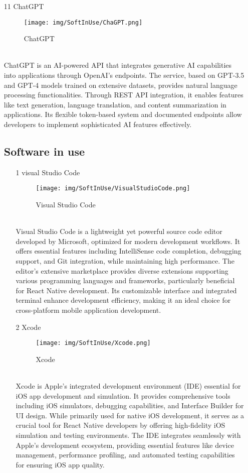 \documentclass[conference]{IEEEtran}
\begin{document}
\begin{enumerate}
\begin{itemize}
\begin{itemize}
\begin{enumerate}
\item[11] ChatGPT
\begin{figure}[h]
\centering
\texttt{[image: img/SoftInUse/ChaGPT.png]}
\caption{ChatGPT} 
\end{figure}\\
ChatGPT is an AI-powered API that integrates generative AI capabilities into applications through OpenAI's endpoints. The service, based on GPT-3.5 and GPT-4 models trained on extensive datasets, provides natural language processing functionalities. Through REST API integration, it enables features like text generation, language translation, and content summarization in applications. Its flexible token-based system and documented endpoints allow developers to implement sophisticated AI features effectively.\\


\subsection{Software in use}
\begin{enumerate}
\item[1] visual Studio Code
\begin{figure}[h]
\centering
\texttt{[image: img/SoftInUse/VisualStudioCode.png]}
\caption{Visual Studio Code} 
\end{figure}\\
Visual Studio Code is a lightweight yet powerful source code editor developed by Microsoft, optimized for modern development workflows. It offers essential features including IntelliSense code completion, debugging support, and Git integration, while maintaining high performance. The editor's extensive marketplace provides diverse extensions supporting various programming languages and frameworks, particularly beneficial for React Native development. Its customizable interface and integrated terminal enhance development efficiency, making it an ideal choice for cross-platform mobile application development.
\\

\item[2] Xcode
\begin{figure}[h]
\centering
\texttt{[image: img/SoftInUse/Xcode.png]}
\caption{Xcode} 
\end{figure}\\
Xcode is Apple's integrated development environment (IDE) essential for iOS app development and simulation. It provides comprehensive tools including iOS simulators, debugging capabilities, and Interface Builder for UI design. While primarily used for native iOS development, it serves as a crucial tool for React Native developers by offering high-fidelity iOS simulation and testing environments. The IDE integrates seamlessly with Apple's development ecosystem, providing essential features like device management, performance profiling, and automated testing capabilities for ensuring iOS app quality.\\


\end{enumerate}
\end{enumerate}
\end{itemize}
\end{itemize}
\end{enumerate}
\end{document}
